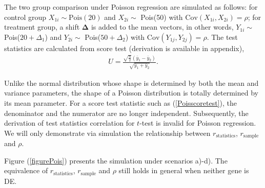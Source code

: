 \documentclass[12pt, a4paper]{article}
\newcommand{\cov}{\text{Cov}}
\begin{document}
	The two group comparison under Poisson regression are simulated as follows: for control group
	$X_{1i} \sim \text{Pois}(20)$ and $X_{2i}\sim $ Pois(50)   with $\cov(X_{1i}, X_{2i}) = \rho$;
	for treatment group, a shift $\bm \Delta$ is added to the mean vectors, in other words, $Y_{1i} \sim
	$ Pois($20 + \Delta_1$) and $Y_{2i} \sim $ Pois($50 + \Delta_2$) with $\cov(Y_{1j}, Y_{2j}) =
	\rho$. The test statistics are calculated from score test (derivation is available in appendix),
	\begin{align}\label{Poisscoretest}
		U = \frac{\sqrt{\frac{n}{2}}(\bar{y}_1- \bar{y}_2)}{\sqrt{\bar{y}_1 + \bar{y}_2}}.
	\end{align}
	
	Unlike the normal distribution whose shape is determined by both the mean and variance parameters,
	the shape of a Poisson distribution is totally determined by its mean parameter. For a score test
	statistic such as (\ref{Poisscoretest}), the denominator and the numerator are no longer
	independent. Subsequently, the derivation of test statistics correlation for $t$-test is invalid for
	Poisson regression. We will only demonstrate via simulation the relationship between 
	$r_\text{statistics}$, $r_{\text{sample}}$ and $\rho$.
	
	Figure (\ref{figurePois}) presents the simulation under scenarios a)-d). The equivalence of
	$r_\text{statistics}$, $r_{\text{sample}}$ and $\rho$ still holds in general when neither gene is
	DE.  
	
\end{document}
